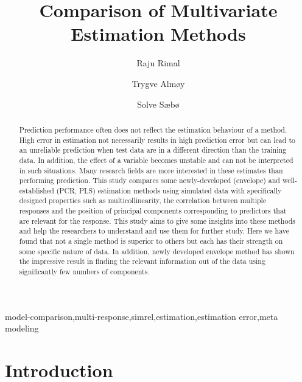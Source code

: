\documentclass[12pt,3p,authoryear]{elsarticle}
\begin{document}
\begin{frontmatter}

  \title{Comparison of Multivariate Estimation Methods}
  
    \author[KBM]{Raju Rimal}
    \author[KBM]{Trygve Almøy}
  
    \author[NMBU]{Solve Sæbø}
  
      \address[KBM]{Faculty of Chemistry and Bioinformatics, Norwegian University of Life Sciences, Ås, Norway}
    \address[NMBU]{Prorector, Norwegian University of Life Sciences, Ås, Norway}
  
  \begin{abstract}
  Prediction performance often does not reflect the estimation behaviour of a method. High error in estimation not necessarily results in high prediction error but can lead to an unreliable prediction when test data are in a different direction than the training data. In addition, the effect of a variable becomes unstable and can not be interpreted in such situations. Many research fields are more interested in these estimates than performing prediction. This study compares some newly-developed (envelope) and well-established (PCR, PLS) estimation methods using simulated data with specifically designed properties such as multicollinearity, the correlation between multiple responses and the position of principal components corresponding to predictors that are relevant for the response. This study aims to give some insights into these methods and help the researchers to understand and use them for further study. Here we have found that not a single method is superior to others but each has their strength on some specific nature of data. In addition, newly developed envelope method has shown the impressive result in finding the relevant information out of the data using significantly few numbers of components.
  \end{abstract}
   \begin{keyword} model-comparison,multi-response,simrel,estimation,estimation error,meta modeling\end{keyword}

\end{frontmatter}

\hypertarget{introduction}{%
\section{Introduction}\label{introduction}}
\end{document}
